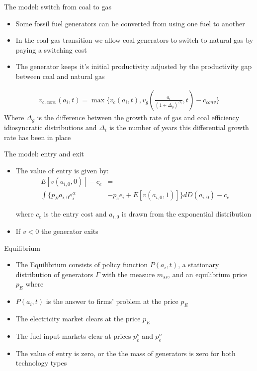\documentclass{beamer}
\begin{document}
\begin{frame}{The model: switch from coal to gas}
\begin{itemize}
    \item Some fossil fuel generators can be converted from using one fuel to another
    \item In the coal-gas transition we allow coal generators to switch to natural gas by paying a switching cost
    \item The generator keeps it's initial productivity adjusted by the productivity gap between coal and natural gas
\end{itemize}
\begin{align*}
    v_{c,conv}(a_i,t) = \max \big\{ v_c(a_i,t), v_g(\frac{a_i}{(1+\Delta_g)^{\Delta_t}},t)-c_{conv}\big\}
\end{align*}
Where $\Delta_g$ is the difference between the growth rate of gas and coal efficiency idiosyncratic distributions and $\Delta_t$ is the number of years this differential growth rate has been in place
\end{frame}
\begin{frame}{The model: entry and exit}
\begin{itemize}
    \item The value of entry is given by: 
    \begin{equation*}
    \begin{aligned} 
    E[v(a_{i,0},0)]-c_{e}&=\\\int \big\{ p_Ea_{i,0} e_i^\alpha &-p_e e_i+E[v(a_{i,0},1)] \big\} dD(a_{i,0})-c_{e}
\end{aligned}
    \end{equation*}
    
where $c_{e}$ is the entry cost and $a_{i,0}$ is drawn from the exponential distribution
\hfill \break
    \item If $v<0$ the generator exits
\end{itemize}
    
\end{frame}
\begin{frame}{Equilibrium}
    \begin{itemize}
        \item The Equilibrium consists of policy function $P(a_i,t)$, a stationary distribution of generators $\Gamma$ with the measure $m_{ss}$, and an equilibrium price $p_E$ where
        \item  $P(a_i,t)$ is the answer to firms' problem at the price $p_E$
        \item The electricity market clears at the price $p_E$ 
        \item The fuel input markets clear at prices $p_e^o$ and $p_e^n$
        \item The value of entry is zero, or the the mass of generators is zero for both technology types
    \end{itemize}
\end{frame}
\end{document}
